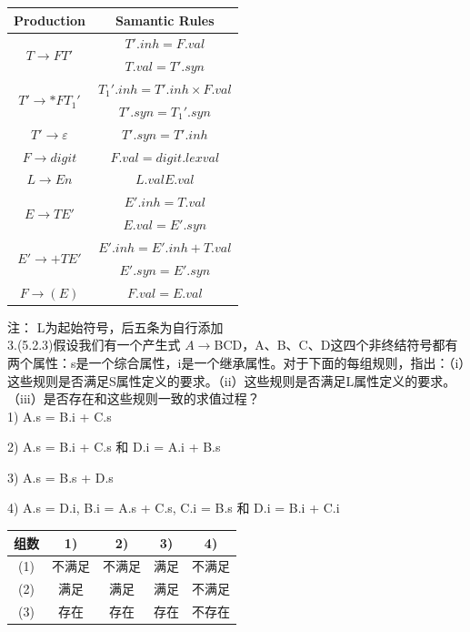 \documentclass[a4paper, 10pt]{article}
\begin{document}
\begin{table}[H]
\centering
\begin{tabular}{c|c}
\hline
\hline
Production & Samantic Rules\\ 
\hline
\multirow{2}{*}{$T \rightarrow FT' $} & $T'.inh = F.val$ \\
 & $T.val = T'.syn$ \\
\hline
\multirow{2}{*}{$T' \rightarrow *FT_1' $} & $T_1'.inh =T'.inh \times F.val$ \\
 & $T'.syn = T_1'.syn$ \\
 \hline
$T' \rightarrow \varepsilon $ &$T'.syn = T'.inh $ \\
\hline
$F\rightarrow digit $ &$ F.val = digit.lexval $ \\
\hline
$L \rightarrow En$ &$L.val E.val$ \\
\hline
\multirow{2}{*}{$E \rightarrow TE'$} & $E'.inh = T.val$ \\
&  $ E.val = E'.syn$ \\
\hline
\multirow{2}{*}{$E' \rightarrow +TE'$ }& $E'.inh = E'.inh + T.val $ \\
& $E'.syn = E'.syn$ \\
\hline
$F\rightarrow (E) $ &$F.val = E.val$ \\

\hline
\end{tabular}
\end{table}
注： L为起始符号，后五条为自行添加\\

3.(5.2.3)假设我们有一个产生式 $A \rightarrow $BCD，A、B、C、D这四个非终结符号都有两个属性：s是一个综合属性，i是一个继承属性。对于下面的每组规则，指出：（i）这些规则是否满足S属性定义的要求。（ii）这些规则是否满足L属性定义的要求。（iii）是否存在和这些规则一致的求值过程？\\

1) A.s = B.i + C.s

2) A.s = B.i + C.s 和 D.i = A.i + B.s

3) A.s = B.s + D.s

4) A.s = D.i, B.i = A.s + C.s, C.i = B.s 和 D.i = B.i + C.i

\begin{table}[H]
\centering
\begin{tabular}{c|c|c|c|c}
\hline
\hline
组数 & 1) & 2) & 3) & 4) \\
\hline
(1) & 不满足 & 不满足 & 满足 & 不满足\\
\hline
(2)&满足& 满足 & 满足 & 不满足\\
\hline
(3) & 存在 &存在 & 存在 & 不存在\\
\hline
\end{tabular}
\end{table}
\end{document}
